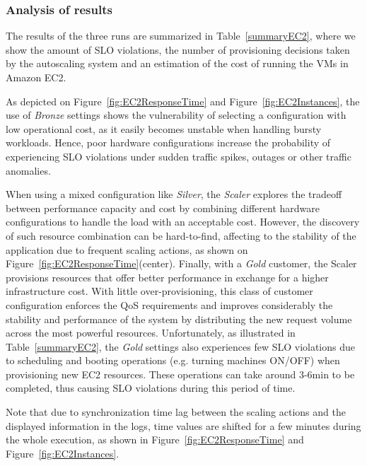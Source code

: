 \subsubsection{Analysis of results}
The results of the three runs are summarized in Table~\ref{summaryEC2}, where we show the amount of SLO violations, the number of provisioning decisions taken by the autoscaling system and an estimation of the cost of running the VMs in Amazon EC2.

As depicted on Figure~\ref{fig:EC2ResponseTime} and Figure~\ref{fig:EC2Instances}, the use of \emph{Bronze} settings shows the vulnerability of selecting a configuration with low operational cost, as it easily becomes unstable when handling bursty workloads. Hence, poor hardware configurations increase the probability of experiencing SLO violations under sudden traffic spikes, outages or other traffic anomalies. 

When using a mixed configuration like \emph{Silver}, the \emph{Scaler} explores the tradeoff between performance capacity and cost by combining different hardware configurations to handle the load with an acceptable cost. However, the discovery of such resource combination can be hard-to-find, affecting to the stability of the application due to frequent scaling actions, as shown on Figure~\ref{fig:EC2ResponseTime}(center). Finally, with a \emph{Gold} customer, the Scaler provisions resources that offer better performance in exchange for a higher infrastructure cost. With little over-provisioning, this class of customer configuration enforces the QoS requirements and improves considerably the stability and performance of the system by distributing the new request volume across the most powerful resources. Unfortunately, as illustrated in Table~\ref{summaryEC2}, the \emph{Gold} settings also experiences few SLO violations due to scheduling and booting operations (e.g. turning machines ON/OFF) when provisioning new EC2 resources. These operations can take around 3-6min to be completed, thus causing SLO violations during this period of time.

Note that due to synchronization time lag between the scaling actions and the displayed information in the logs, time values are shifted for a few minutes during the whole execution, as shown in Figure~\ref{fig:EC2ResponseTime} and Figure~\ref{fig:EC2Instances}.



